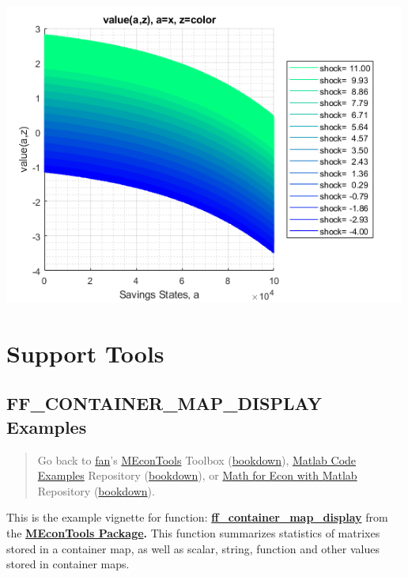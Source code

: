 \documentclass[
]{book}
\begin{document}
\includegraphics[width=5.20833in,height=\textheight]{img/fx_graph_grid_images/figure_7.png}

\hypertarget{support-tools}{%
\chapter{Support Tools}\label{support-tools}}

\hypertarget{ff_container_map_display-examples}{%
\section{FF\_CONTAINER\_MAP\_DISPLAY Examples}\label{ff_container_map_display-examples}}

\begin{quote}
Go back to \href{http://fanwangecon.github.io/}{fan}'s \href{https://fanwangecon.github.io/MEconTools/}{MEconTools} Toolbox (\href{https://fanwangecon.github.io/MEconTools/bookdown}{bookdown}), \href{https://fanwangecon.github.io/M4Econ/}{Matlab Code Examples} Repository (\href{https://fanwangecon.github.io/M4Econ/bookdown}{bookdown}), or \href{https://fanwangecon.github.io/Math4Econ/}{Math for Econ with Matlab} Repository (\href{https://fanwangecon.github.io/Math4Econ/bookdown}{bookdown}).
\end{quote}

This is the example vignette for function:
\href{https://github.com/FanWangEcon/MEconTools/blob/master/MEconTools/tools/ff_container_map_display.m}{\textbf{ff\_container\_map\_display}}
from the \href{https://fanwangecon.github.io/MEconTools/}{\textbf{MEconTools
Package}}\textbf{.} This function
summarizes statistics of matrixes stored in a container map, as well as
scalar, string, function and other values stored in container maps.
\end{document}
